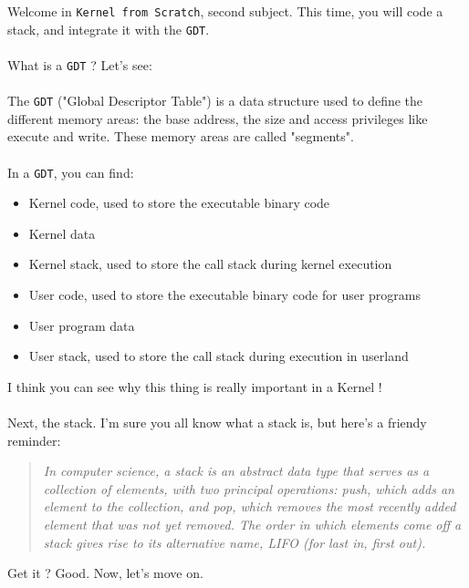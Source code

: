 \documentclass{42-en}
\begin{document}
	Welcome in \texttt{Kernel from Scratch}, second subject.
	This time, you will code a stack, and integrate it with the \texttt{GDT}.\\
	\\
	What is a \texttt{GDT} ? Let's see:\\
	\\
	The \texttt{GDT} ("Global Descriptor Table") is a data structure used to define the
	different memory areas: the base address, the size and access privileges
	like execute and write. These memory areas are called "segments".\\
	\\In a \texttt{GDT}, you can find:
	\begin{itemize}\itemsep1pt
		\item Kernel code, used to store the executable binary code
		\item Kernel data
		\item Kernel stack, used to store the call stack during kernel execution
		\item User code, used to store the executable binary code for user programs
		\item User program data
		\item User stack, used to store the call stack during execution in userland
	\end{itemize}
	I think you can see why this thing is really important in a Kernel !\\
	\\
	Next, the stack. I'm sure you all know what a stack is, but here's a friendy
	reminder:
	\begin{quotation}
		\textit{In computer science, a stack is an abstract data type that serves as a
		collection of elements, with two principal operations: push, which adds an
		element to the collection, and pop, which removes the most recently added
		element that was not yet removed. The order in which elements come off a
		stack gives rise to its alternative name, LIFO (for last in, first out).}
	\end{quotation}
	Get it ? Good. Now, let's move on.

\newpage
\end{document}
